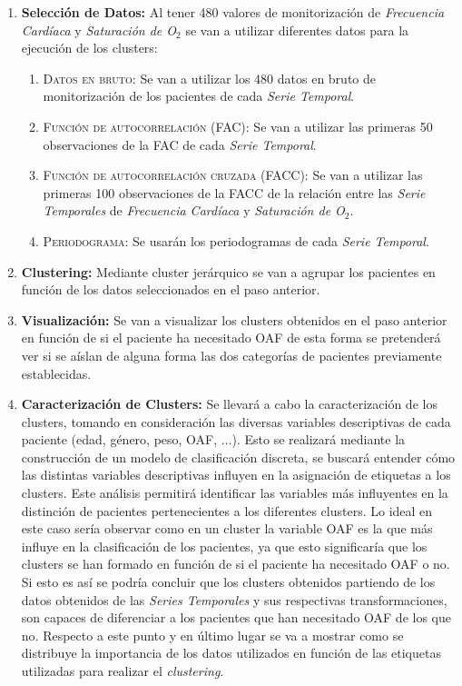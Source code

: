 \begin{enumerate}
    \item \textbf{Selección de Datos:} Al tener 480 valores de monitorización de \textit{Frecuencia Cardíaca} y \textit{Saturación de O$_2$} se van a utilizar diferentes datos para la ejecución de los clusters:
    \begin{enumerate}
        \item \textsc{Datos en bruto:} Se van a utilizar los 480 datos en bruto de monitorización de los pacientes de cada \textit{Serie Temporal}.
        \item \textsc{Función de autocorrelación (FAC):} Se van a utilizar las primeras 50 observaciones de la FAC de cada \textit{Serie Temporal}.
        \item \textsc{Función de autocorrelación cruzada (FACC):} Se van a utilizar las primeras 100 observaciones de la FACC de la relación entre las \textit{Serie Temporales} de \textit{Frecuencia Cardíaca} y \textit{Saturación de O$_2$}.
        \item \textsc{Periodograma:} Se usarán los periodogramas de cada \textit{Serie Temporal}.
    \end{enumerate}
    \item \textbf{Clustering:} Mediante cluster jerárquico se van a agrupar los pacientes en función de los datos seleccionados en el paso anterior.
    \item \textbf{Visualización:} Se van a visualizar los clusters obtenidos en el paso anterior en función de si el paciente ha necesitado OAF de esta forma se pretenderá ver si se aíslan de alguna forma las dos categorías de pacientes previamente establecidas. 
    \item \textbf{Caracterización de Clusters:} 
    Se llevará a cabo la caracterización de los clusters, tomando en consideración las diversas variables descriptivas de cada paciente (edad, género, peso, OAF, ...). Esto se realizará mediante la construcción de un modelo de clasificación discreta, se buscará entender cómo las distintas variables descriptivas influyen en la asignación de etiquetas a los clusters. Este análisis permitirá identificar las variables más influyentes en la distinción de pacientes pertenecientes a los diferentes clusters. Lo ideal en este caso sería observar como en un cluster la variable OAF es la que más influye en la clasificación de los pacientes, ya que esto significaría que los clusters se han formado en función de si el paciente ha necesitado OAF o no. Si esto es así se podría concluir que los clusters obtenidos partiendo de los datos obtenidos de las \textit{Series Temporales} y sus respectivas transformaciones, son capaces de diferenciar a los pacientes que han necesitado OAF de los que no. Respecto a este punto y en último lugar se va a mostrar como se distribuye la importancia de los datos utilizados en función de las etiquetas utilizadas para realizar el \textit{clustering}.

\end{enumerate}
